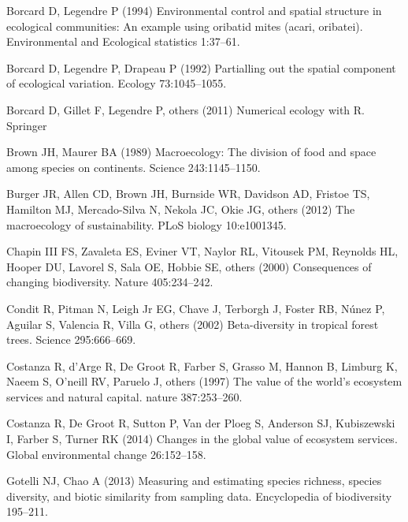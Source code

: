 \documentclass[
  11pt,
]{book}
\newlength{\cslhangindent}
\newenvironment{CSLReferences}[2] %
 {\begin{list}{}{%
  \setlength{\itemindent}{0pt}
  \setlength{\leftmargin}{0pt}
  \setlength{\parsep}{0pt}
  \ifodd #1
   \setlength{\leftmargin}{\cslhangindent}
   \setlength{\itemindent}{-1\cslhangindent}
  \fi
  \setlength{\itemsep}{#2\baselineskip}}}
 {\end{list}}
\begin{document}
\label{refs}
\begin{CSLReferences}{1}{1}
Borcard D, Legendre P (1994) Environmental control and spatial structure
in ecological communities: An example using oribatid mites (acari,
oribatei). Environmental and Ecological statistics 1:37--61.

Borcard D, Legendre P, Drapeau P (1992) Partialling out the spatial
component of ecological variation. Ecology 73:1045--1055.

Borcard D, Gillet F, Legendre P, others (2011) Numerical ecology with
{R}. Springer

Brown JH, Maurer BA (1989) Macroecology: The division of food and space
among species on continents. Science 243:1145--1150.

Burger JR, Allen CD, Brown JH, Burnside WR, Davidson AD, Fristoe TS,
Hamilton MJ, Mercado-Silva N, Nekola JC, Okie JG, others (2012) The
macroecology of sustainability. PLoS biology 10:e1001345.

Chapin III FS, Zavaleta ES, Eviner VT, Naylor RL, Vitousek PM, Reynolds
HL, Hooper DU, Lavorel S, Sala OE, Hobbie SE, others (2000) Consequences
of changing biodiversity. Nature 405:234--242.

Condit R, Pitman N, Leigh Jr EG, Chave J, Terborgh J, Foster RB, Núnez
P, Aguilar S, Valencia R, Villa G, others (2002) Beta-diversity in
tropical forest trees. Science 295:666--669.

Costanza R, d'Arge R, De Groot R, Farber S, Grasso M, Hannon B, Limburg
K, Naeem S, O'neill RV, Paruelo J, others (1997) The value of the
world's ecosystem services and natural capital. nature 387:253--260.

Costanza R, De Groot R, Sutton P, Van der Ploeg S, Anderson SJ,
Kubiszewski I, Farber S, Turner RK (2014) Changes in the global value of
ecosystem services. Global environmental change 26:152--158.

Gotelli NJ, Chao A (2013) Measuring and estimating species richness,
species diversity, and biotic similarity from sampling data.
Encyclopedia of biodiversity 195--211.


\end{CSLReferences}
\end{document}

